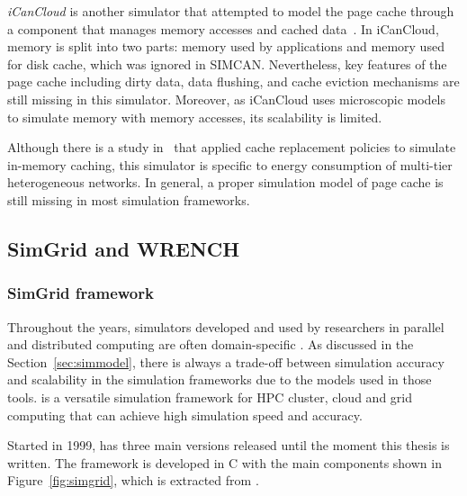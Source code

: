 \textit{iCanCloud} is another simulator that attempted to model the page cache 
through a component that manages memory accesses and cached 
data~\cite{nunez2012icancloud}. 
In iCanCloud, memory is split into two parts: memory used by applications 
and memory used for disk cache, which was ignored in SIMCAN. 
Nevertheless, key features of the page cache including dirty data, 
data flushing, and cache eviction mechanisms are still missing 
in this simulator.
Moreover, as iCanCloud uses microscopic models to simulate memory 
with memory accesses, its scalability is limited. 

Although there is a study in~\cite{xu2018saving} that applied cache 
replacement policies to simulate in-memory caching, this simulator 
is specific to energy consumption of multi-tier heterogeneous networks.
In general, a proper simulation model of page cache is still missing 
in most simulation frameworks.

\subsection{SimGrid and WRENCH}

\subsubsection{SimGrid framework}

Throughout the years, simulators developed and used by researchers in 
parallel and distributed computing are often domain-specific 
\cite{casanova2014simgrid}.
As discussed in the Section~\ref{sec:simmodel}, there is always a trade-off 
between simulation accuracy and scalability in the simulation frameworks due 
to the models used in those tools. 
\simgrid is a versatile simulation framework for HPC cluster, cloud and 
grid computing that can achieve high simulation speed and accuracy.

Started in 1999, \simgrid has three main versions released until the moment 
this thesis is written. 
The \simgrid framework is developed in C with the main components shown in 
Figure~\ref{fig:simgrid}, which is extracted from \cite{casanova2014simgrid}.

